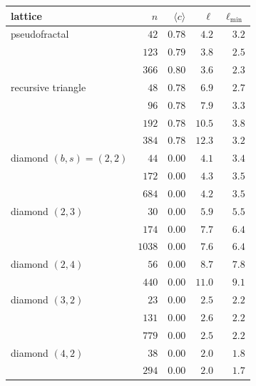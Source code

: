 \begin{center}
\footnotesize\setlength{\tabcolsep}{5pt}
\begin{tabular}{lrrrr}
\hline
lattice & $n$ & $\langle c\rangle$ & $\ell$ & $\ell_{\min}$\\
\hline
pseudofractal & $42$ & $0.78$ & $4.2$ & $3.2$\\
 & $123$ & $0.79$ & $3.8$ & $2.5$\\
 & $366$ & $0.80$ & $3.6$ & $2.3$\\
recursive triangle & $48$ & $0.78$ & $6.9$ & $2.7$\\
 & $96$ & $0.78$ & $7.9$ & $3.3$\\
 & $192$ & $0.78$ & $10.5$ & $3.8$\\
 & $384$ & $0.78$ & $12.3$ & $3.2$\\
diamond $(b,s)=(2,2)$ & $44$ & $0.00$ & $4.1$ & $3.4$\\
 & $172$ & $0.00$ & $4.3$ & $3.5$\\
 & $684$ & $0.00$ & $4.2$ & $3.5$\\
diamond $(2,3)$ & $30$ & $0.00$ & $5.9$ & $5.5$\\
 & $174$ & $0.00$ & $7.7$ & $6.4$\\
 & $1038$ & $0.00$ & $7.6$ & $6.4$\\
diamond $(2,4)$ & $56$ & $0.00$ & $8.7$ & $7.8$\\
 & $440$ & $0.00$ & $11.0$ & $9.1$\\
diamond $(3,2)$ & $23$ & $0.00$ & $2.5$ & $2.2$\\
 & $131$ & $0.00$ & $2.6$ & $2.2$\\
 & $779$ & $0.00$ & $2.5$ & $2.2$\\
diamond $(4,2)$ & $38$ & $0.00$ & $2.0$ & $1.8$\\
 & $294$ & $0.00$ & $2.0$ & $1.7$\\
\hline
\end{tabular}
\end{center}
